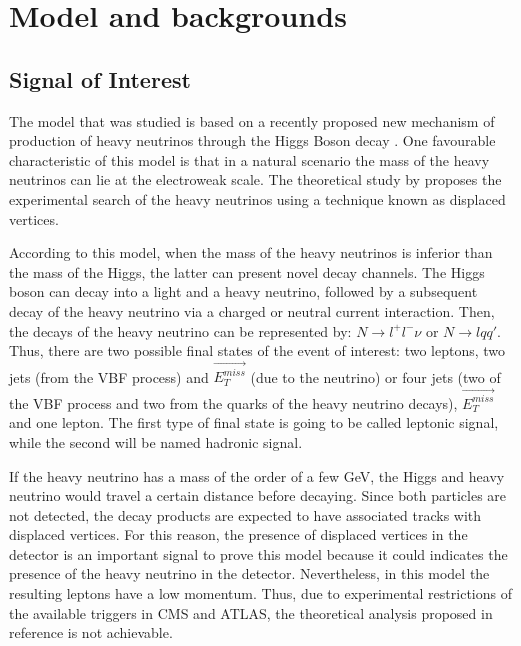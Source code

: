  \chapter{Model and backgrounds}

 
\section{Signal of Interest}

The model that was studied is based on a recently proposed new mechanism of production of heavy neutrinos through the Higgs Boson decay \cite{Seesaw Mechanism with displaced vertices}. One
favourable characteristic of this model is that in a natural scenario the mass of the heavy neutrinos can lie at the electroweak scale. The theoretical study by \cite{Seesaw Mechanism with displaced vertices} 
proposes the experimental search of the heavy neutrinos using a technique known as displaced vertices.

According to this model, when the mass of the heavy neutrinos is inferior than the mass of the Higgs, the latter can present novel decay channels. The Higgs boson can decay into a light and a heavy
neutrino, followed by a subsequent decay of the heavy neutrino via a charged or neutral current interaction. Then, the decays of the heavy neutrino can be represented by: $N \rightarrow l^+ l^- \nu$
or $N \rightarrow l q q'$. Thus, there are two possible final states of the event of interest: two leptons, two jets (from the VBF process) and $\vec{E_T^{miss}}$ (due to the neutrino) or four jets 
(two of the VBF process and two from the quarks of the heavy neutrino decays), $\vec{E_T^{miss}}$ and one lepton. The first type of final state is going to be called leptonic signal, while the second
will be named hadronic signal.

If the heavy neutrino has a mass of the order of a few GeV, the Higgs and heavy neutrino would travel a certain distance before decaying. Since both particles are not detected, the decay products are expected to have associated tracks with displaced vertices. For this reason, the presence of displaced vertices in the detector is an important signal to prove this model because it could indicates the presence of the heavy neutrino in the detector. Nevertheless, in this model the resulting leptons have a low momentum. Thus, due to experimental restrictions of the available triggers in CMS and ATLAS, the theoretical analysis proposed in reference \cite{Seesaw Mechanism with displace vertices} is not achievable.  

